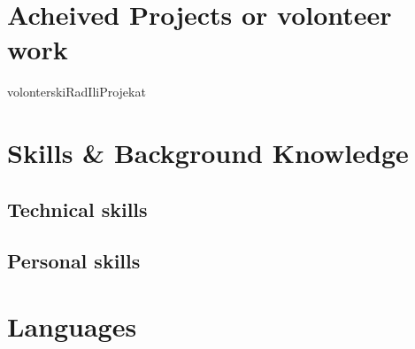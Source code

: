 \documentclass[11pt,a4paper,sans]{moderncv} %
\begin{document}

\section{Acheived Projects or volonteer work}

volonterskiRadIliProjekat
\

\section{Skills \& Background Knowledge}

\subsection{Technical skills}



\subsection{Personal skills}



\section{Languages}

\end{document}
